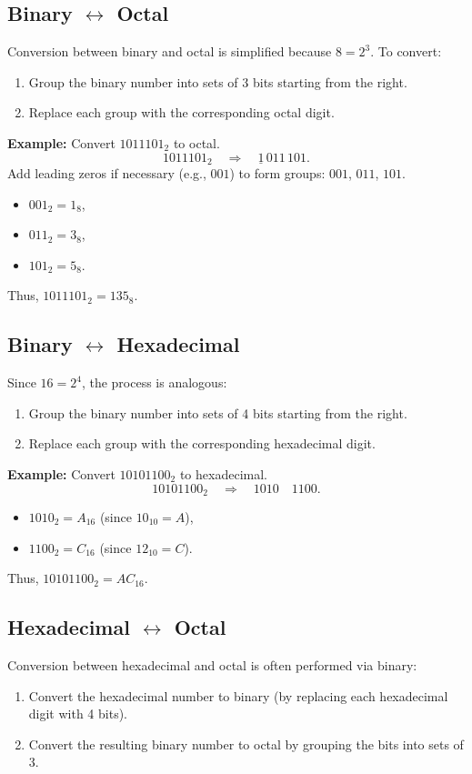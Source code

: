 \documentclass[12pt,a4paper]{article}
\begin{document}
\subsection{Binary \(\leftrightarrow\) Octal}
Conversion between binary and octal is simplified because \(8 = 2^3\). To convert:
\begin{enumerate}
    \item Group the binary number into sets of 3 bits starting from the right.
    \item Replace each group with the corresponding octal digit.
\end{enumerate}

\textbf{Example:} Convert \(1011101_2\) to octal.
\[
1011101_2 \quad \Rightarrow \quad \underline{1}\, 011\, 101.
\]
Add leading zeros if necessary (e.g., \(001\)) to form groups: \(001\), \(011\), \(101\).
\begin{itemize}
    \item \(001_2 = 1_8\),
    \item \(011_2 = 3_8\),
    \item \(101_2 = 5_8\).
\end{itemize}
Thus, \(1011101_2 = 135_8\).

\subsection{Binary \(\leftrightarrow\) Hexadecimal}
Since \(16 = 2^4\), the process is analogous:
\begin{enumerate}
    \item Group the binary number into sets of 4 bits starting from the right.
    \item Replace each group with the corresponding hexadecimal digit.
\end{enumerate}

\textbf{Example:} Convert \(10101100_2\) to hexadecimal.
\[
10101100_2 \quad \Rightarrow \quad 1010 \quad 1100.
\]
\begin{itemize}
    \item \(1010_2 = A_{16}\) (since \(10_{10}=A\)),
    \item \(1100_2 = C_{16}\) (since \(12_{10}=C\)).
\end{itemize}
Thus, \(10101100_2 = AC_{16}\).

\subsection{Hexadecimal \(\leftrightarrow\) Octal}
Conversion between hexadecimal and octal is often performed via binary:
\begin{enumerate}
    \item Convert the hexadecimal number to binary (by replacing each hexadecimal digit with 4 bits).
    \item Convert the resulting binary number to octal by grouping the bits into sets of 3.
\end{enumerate}
\end{document}

